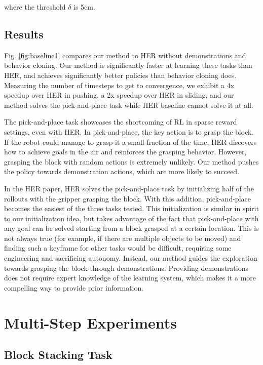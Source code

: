 \noindent where the threshold $\delta$ is 5cm.

\subsection{Results}

Fig. \ref{fig:baseline1} compares our method to HER without demonstrations and behavior cloning. Our method is significantly faster at learning these tasks than HER, and achieves significantly better policies than behavior cloning does. Measuring the number of timesteps to get to convergence, we exhibit a 4x speedup over HER in pushing, a 2x speedup over HER in sliding, and our method solves the pick-and-place task while HER baseline cannot solve it at all.

The pick-and-place task showcases the shortcoming of RL in sparse reward settings, even with HER. In pick-and-place, the key action is to grasp the block. If the robot could manage to grasp it a small fraction of the time, HER discovers how to achieve goals in the air and reinforces the grasping behavior. However, grasping the block with random actions is extremely unlikely. Our method pushes the policy towards demonstration actions, which are more likely to succeed.

In the HER paper, HER solves the pick-and-place task by initializing half of the rollouts with the gripper grasping the block. With this addition, pick-and-place becomes the easiest of the three tasks tested. This initialization is similar in spirit to our initialization idea, but takes advantage of the fact that pick-and-place with any goal can be solved starting from a block grasped at a certain location. This is not always true (for example, if there are multiple objects to be moved) and finding such a keyframe for other tasks would be difficult, requiring some engineering and sacrificing autonomy. Instead, our method guides the exploration towards grasping the block through demonstrations. Providing demonstrations does not require expert knowledge of the learning system, which makes it a more compelling way to provide prior information.

\section{Multi-Step Experiments} \label{sec:multistep}

\subsection{Block Stacking Task}

